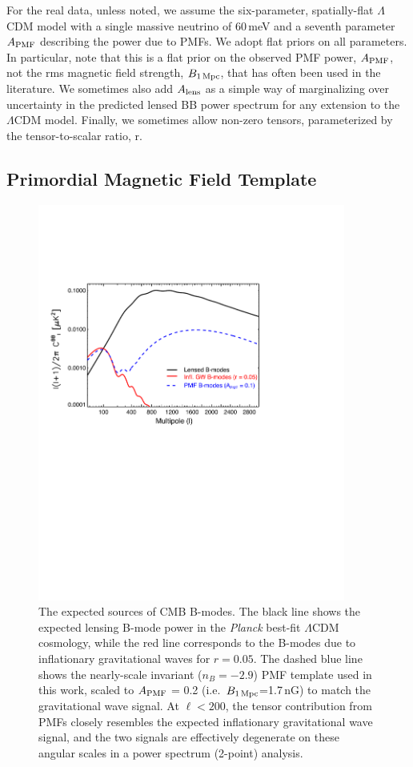 \documentclass[apj]{emulateapj}
\newcommand{\apmf}{\ensuremath{A_{\rm PMF}}}
\newcommand{\bpmf}{\ensuremath{B_{\rm 1\,Mpc}}}
\newcommand{\alens}{\ensuremath{A_{\rm lens}}}
\newcommand{\lcdm}{\ensuremath{\Lambda}CDM}
\newcommand{\planck}{{\sl Planck}}
\begin{document}
For the real data, unless noted, we assume the six-parameter, spatially-flat \lcdm{} model with a single massive neutrino of 60\,meV and a seventh parameter \apmf{} describing the power due to PMFs. 
We adopt flat priors on all parameters. 
In particular, note that this is a flat prior on the observed PMF power, $\apmf$, not the rms magnetic field strength, \bpmf, that has often been used in the literature. 
We sometimes also add \alens{} as a simple way of marginalizing over uncertainty in the predicted lensed BB power spectrum for any extension to the \lcdm{} model. 
Finally, we sometimes allow non-zero tensors, parameterized by the tensor-to-scalar ratio, r. 

\subsection{Primordial Magnetic Field Template}
\label{sec:template}

\begin{figure}[htb]\centering
\includegraphics[width=0.9\textwidth,clip,trim={.5cm 12.cm 6cm 5cm}]{pmf_templates.pdf}
  \caption[CMB polarization from PMFs]{
  The expected sources of CMB B-modes.
  The black line shows the expected lensing B-mode power in the \planck{} best-fit \lcdm{} cosmology, while the red line corresponds to the B-modes due to inflationary gravitational waves for $r=0.05$. 
  The dashed blue line shows the nearly-scale invariant ($n_B=-2.9$) PMF template used in this work, scaled to \apmf{} = 0.2 (i.e.~\bpmf{}=1.7\,nG) to match the gravitational wave signal. 
  At $\ell < 200$, the tensor contribution from PMFs closely resembles the expected inflationary gravitational wave signal, and the two signals are effectively degenerate on these angular scales in a power spectrum (2-point) analysis.
      \label{fig:pmf-bb}
  }
\end{figure}
\end{document}
